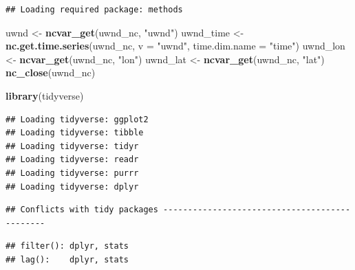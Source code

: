 \documentclass[]{book}
\newenvironment{Shaded}{\begin{snugshade}}{\end{snugshade}}
\newcommand{\KeywordTok}[1]{\textcolor[rgb]{0.13,0.29,0.53}{\textbf{{#1}}}}
\newcommand{\DataTypeTok}[1]{\textcolor[rgb]{0.13,0.29,0.53}{{#1}}}
\newcommand{\StringTok}[1]{\textcolor[rgb]{0.31,0.60,0.02}{{#1}}}
\newcommand{\OtherTok}[1]{\textcolor[rgb]{0.56,0.35,0.01}{{#1}}}
\newcommand{\NormalTok}[1]{{#1}}
\theoremstyle{definition}
\theoremstyle{definition}
\theoremstyle{remark}
\begin{document}
\begin{verbatim}
## Loading required package: methods
\end{verbatim}

\begin{Shaded}
\begin{Highlighting}[]
\NormalTok{uwnd <-}\StringTok{ }\KeywordTok{ncvar_get}\NormalTok{(uwnd_nc, }\StringTok{"uwnd"}\NormalTok{)}
\NormalTok{uwnd_time <-}\StringTok{ }\KeywordTok{nc.get.time.series}\NormalTok{(uwnd_nc, }\DataTypeTok{v =} \StringTok{"uwnd"}\NormalTok{, }\DataTypeTok{time.dim.name =} \StringTok{"time"}\NormalTok{)}
\NormalTok{uwnd_lon <-}\StringTok{ }\KeywordTok{ncvar_get}\NormalTok{(uwnd_nc, }\StringTok{"lon"}\NormalTok{)}
\NormalTok{uwnd_lat <-}\StringTok{ }\KeywordTok{ncvar_get}\NormalTok{(uwnd_nc, }\StringTok{"lat"}\NormalTok{)}
\KeywordTok{nc_close}\NormalTok{(uwnd_nc)}

\KeywordTok{library}\NormalTok{(tidyverse)}
\end{Highlighting}
\end{Shaded}

\begin{verbatim}
## Loading tidyverse: ggplot2
## Loading tidyverse: tibble
## Loading tidyverse: tidyr
## Loading tidyverse: readr
## Loading tidyverse: purrr
## Loading tidyverse: dplyr
\end{verbatim}

\begin{verbatim}
## Conflicts with tidy packages ----------------------------------------------
\end{verbatim}

\begin{verbatim}
## filter(): dplyr, stats
## lag():    dplyr, stats
\end{verbatim}

\begin{Shaded}
\end{Shaded}
\end{document}
